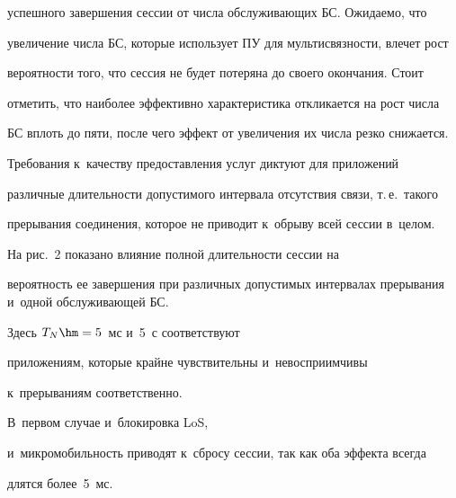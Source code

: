 успешного завершения сессии от чис\-ла об\-слу\-жи\-ва\-ющих БС. Ожидаемо, что 


увеличение чис\-ла БС, которые использует ПУ для муль\-ти\-связ\-ности, влечет рост 


вероятности того, что сессия не будет потеряна до своего окончания. Стоит 


отметить, что наиболее эффективно характеристика откликается на рост чис\-ла 


БС вплоть до пяти, после чего эффект от увеличения их чис\-ла резко снижается.


  


  Требования к~качеству предоставления услуг диктуют для приложений 


различные длительности допустимого интервала отсутствия связи, т.\,е.\ такого 


прерывания со\-еди\-не\-ния, которое не приводит к~обрыву всей сессии в~целом. 


  


 


  


  На рис.~2 показано влияние полной длительности сессии на 


вероятность ее завершения при различных до\-пус\-ти\-мых интервалах прерывания и~одной об\-слу\-жи\-ва\-ющей БС. 


Здесь $T_N\hm=5$~мс и~5~с соответствуют 


приложениям, которые крайне чувствительны и~невосприимчивы 


к~прерываниям соответственно.


В~первом случае и~блокировка LoS, 


и~мик\-ро\-мо\-бил\-ьность приводят к~сбросу сессии, так как оба эффекта всегда 


длятся более~5~мс. 


